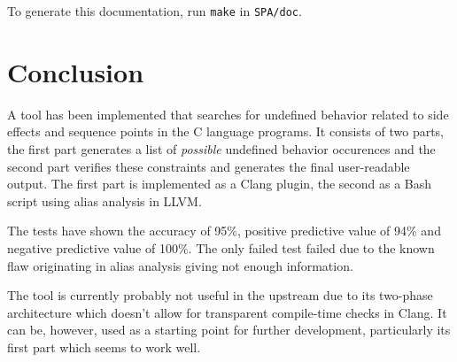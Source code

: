 To generate this documentation, run \verb|make| in \verb|SPA/doc|.
\chapter{Conclusion}
A tool has been implemented that searches for undefined behavior related to side effects and sequence points in the C language programs. It consists of two parts, the first part generates a list of \emph{possible} undefined behavior occurences and the second part verifies these constraints and generates the final user-readable output. The first part is implemented as a Clang plugin, the second as a Bash script using alias analysis in LLVM.

The tests have shown the accuracy of 95\%, positive predictive value of 94\% and negative predictive value of 100\%. The only failed test failed due to the known flaw  originating in alias analysis giving not enough information.

The tool is currently probably not useful in the upstream due to its two-phase architecture which doesn't allow for transparent compile-time checks in Clang. It can be, however, used as a starting point for further development, particularly its first part which seems to work well.
